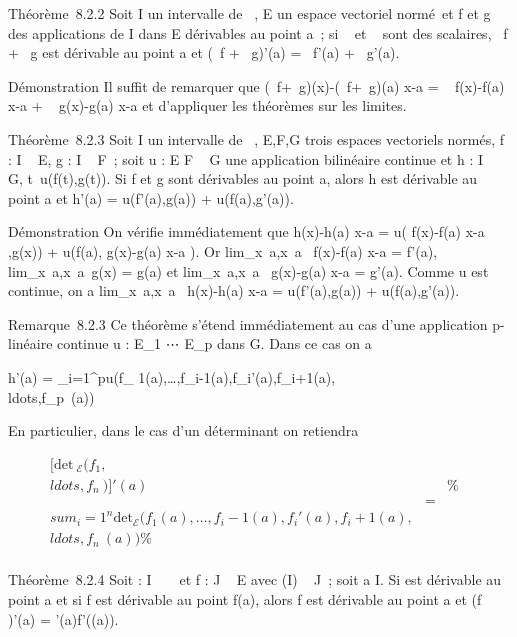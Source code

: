 \documentclass[]{article}
\begin{document}
Théorème~8.2.2 Soit I un intervalle de ~, E un espace vectoriel normé~et
f et g des applications de I dans E dérivables au point a~; si \alpha~ et \beta~
sont des scalaires, \alpha~f + \beta~g est dérivable au point a et (\alpha~f + \beta~g)'(a) =
\alpha~f'(a) + \beta~g'(a).

Démonstration Il suffit de remarquer que  (\alpha~f+\beta~g)(x)-(\alpha~f+\beta~g)(a)
\over x-a = \alpha~ f(x)-f(a) \over x-a +
\beta~ g(x)-g(a) \over x-a et d'appliquer les théorèmes
sur les limites.

Théorème~8.2.3 Soit I un intervalle de ~, E,F,G trois espaces vectoriels
normés, f : I \rightarrow~ E, g : I \rightarrow~ F~; soit u : E \times F \rightarrow~ G une application
bilinéaire continue et h : I \rightarrow~ G,
t\mapsto~u(f(t),g(t)). Si f et g sont dérivables au
point a, alors h est dérivable au point a et h'(a) = u(f'(a),g(a)) +
u(f(a),g'(a)).

Démonstration On vérifie immédiatement que  h(x)-h(a)
\over x-a = u( f(x)-f(a) \over x-a
,g(x)) + u(f(a), g(x)-g(a) \over x-a ). Or
lim_x\rightarrow~a,x\neq~a~
f(x)-f(a) \over x-a = f'(a),
lim_x\rightarrow~a,x\neq~a~g(x)
= g(a) et
lim_x\rightarrow~a,x\neq~a~
g(x)-g(a) \over x-a = g'(a). Comme u est continue, on a
lim_x\rightarrow~a,x\neq~a~
h(x)-h(a) \over x-a = u(f'(a),g(a)) + u(f(a),g'(a)).

Remarque~8.2.3 Ce théorème s'étend immédiatement au cas d'une
application p-linéaire continue u : E_1
\times⋯ \times E_p dans G. Dans ce cas on a

h'(a) = \sum _i=1^pu(f_
1(a),\ldots,f_i-1(a),f_i'(a),f_i+1(a),\\ldots,f_p~(a))

En particulier, dans le cas d'un déterminant on retiendra

\begin{align*}
{[}\mathrm{det}~
_\mathcal{E}(f_1,\\ldots,f_n~){]}'(a)&&
\%& \\ & =& \\sum
_i=1^n \mathrm{det} _
\mathcal{E}(f_1(a),\ldots,f_i-1(a),f_i'(a),f_i+1(a),\\ldots,f_n~(a))\%&
\\ \end{align*}

Théorème~8.2.4 Soit \phi : I \rightarrow~ ~ et f : J \rightarrow~ E avec \phi(I) \subset~ J~; soit a \in I.
Si \phi est dérivable au point a et si f est dérivable au point f(a), alors
f \cdot \phi est dérivable au point a et (f \cdot \phi)'(a) = \phi'(a)f'(\phi(a)).
\end{document}

